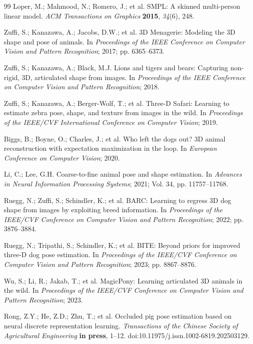 \documentclass[computers,article,submit,pdftex,moreauthors]{mdpi}
\begin{document}
\begin{thebibliography}{99}
 Loper, M.; Mahmood, N.; Romero, J.; et al. SMPL: A skinned multi-person linear model. \textit{ACM Transactions on Graphics} \textbf{2015}, \textit{34}(6), 248.

 Zuffi, S.; Kanazawa, A.; Jacobs, D.W.; et al. 3D Menagerie: Modeling the 3D shape and pose of animals. In \textit{Proceedings of the IEEE Conference on Computer Vision and Pattern Recognition}; 2017; pp. 6365--6373.

 Zuffi, S.; Kanazawa, A.; Black, M.J. Lions and tigers and bears: Capturing non-rigid, 3D, articulated shape from images. In \textit{Proceedings of the IEEE Conference on Computer Vision and Pattern Recognition}; 2018.

 Zuffi, S.; Kanazawa, A.; Berger-Wolf, T.; et al. Three-D Safari: Learning to estimate zebra pose, shape, and texture from images in the wild. In \textit{Proceedings of the IEEE/CVF International Conference on Computer Vision}; 2019.

 Biggs, B.; Boyne, O.; Charles, J.; et al. Who left the dogs out? 3D animal reconstruction with expectation maximization in the loop. In \textit{European Conference on Computer Vision}; 2020.

 Li, C.; Lee, G.H. Coarse-to-fine animal pose and shape estimation. In \textit{Advances in Neural Information Processing Systems}; 2021; Vol. 34, pp. 11757--11768.

 Ruegg, N.; Zuffi, S.; Schindler, K.; et al. BARC: Learning to regress 3D dog shape from images by exploiting breed information. In \textit{Proceedings of the IEEE/CVF Conference on Computer Vision and Pattern Recognition}; 2022; pp. 3876--3884.

 Ruegg, N.; Tripathi, S.; Schindler, K.; et al. BITE: Beyond priors for improved three-D dog pose estimation. In \textit{Proceedings of the IEEE/CVF Conference on Computer Vision and Pattern Recognition}; 2023; pp. 8867--8876.

 Wu, S.; Li, R.; Jakab, T.; et al. MagicPony: Learning articulated 3D animals in the wild. In \textit{Proceedings of the IEEE/CVF Conference on Computer Vision and Pattern Recognition}; 2023.

 Rong, Z.Y.; He, Z.D.; Zhu, T.; et al. Occluded pig pose estimation based on neural discrete representation learning. \textit{Transactions of the Chinese Society of Agricultural Engineering} \textbf{in press}, 1--12. doi:10.11975/j.issn.1002-6819.202503129.


\end{thebibliography}
\end{document}
